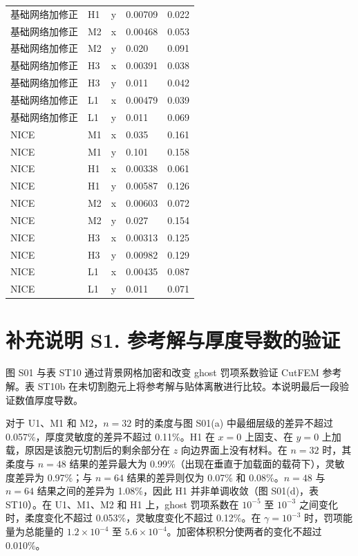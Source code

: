 \documentclass[preprint,12pt,authoryear]{elsarticle}
\begin{document}
{\begin{longtable}[]{@{}lllll@{}}
基础网络加修正 & H1 & y & 0.00709 & 0.022 \\
基础网络加修正 & M2 & x & 0.00468 & 0.053 \\
基础网络加修正 & M2 & y & 0.020 & 0.091 \\
基础网络加修正 & H3 & x & 0.00391 & 0.038 \\
基础网络加修正 & H3 & y & 0.011 & 0.042 \\
基础网络加修正 & L1 & x & 0.00479 & 0.039 \\
基础网络加修正 & L1 & y & 0.011 & 0.069 \\
NICE & M1 & x & 0.035 & 0.161 \\
NICE & M1 & y & 0.101 & 0.158 \\
NICE & H1 & x & 0.00338 & 0.061 \\
NICE & H1 & y & 0.00587 & 0.126 \\
NICE & M2 & x & 0.00603 & 0.072 \\
NICE & M2 & y & 0.027 & 0.154 \\
NICE & H3 & x & 0.00313 & 0.125 \\
NICE & H3 & y & 0.00982 & 0.129 \\
NICE & L1 & x & 0.00435 & 0.087 \\
NICE & L1 & y & 0.011 & 0.071 \\
\end{longtable}}

\section{补充说明 S1. 参考解与厚度导数的验证}

图 S01 与表 ST10 通过背景网格加密和改变 ghost 罚项系数验证 CutFEM 参考解。表 ST10b 在未切割胞元上将参考解与贴体离散进行比较。本说明最后一段验证数值厚度导数。

对于 U1、M1 和 M2，\(n=32\) 时的柔度与图 S01(a) 中最细层级的差异不超过 0.057\%，厚度灵敏度的差异不超过 0.11\%。H1 在 \(x=0\) 上固支、在 \(y=0\) 上加载，原因是该胞元切割后的剩余部分在 \(z\) 向边界面上没有材料。在 \(n=32\) 时，其柔度与 \(n=48\) 结果的差异最大为 0.99\%（出现在垂直于加载面的载荷下），灵敏度差异为 0.97\%；与 \(n=64\) 结果的差异则仅为 0.07\% 和 0.08\%。\(n=48\) 与 \(n=64\) 结果之间的差异为 1.08\%，因此 H1 并非单调收敛（图 S01(d)，表 ST10）。在 U1、M1、M2 和 H1 上，ghost 罚项系数在 \(10^{-5}\) 至 \(10^{-3}\) 之间变化时，柔度变化不超过 0.053\%，灵敏度变化不超过 0.12\%。在 \(\gamma=10^{-3}\) 时，罚项能量为总能量的 \(1.2\times10^{-4}\) 至 \(5.6\times10^{-4}\)。加密体积积分使两者的变化不超过 0.010\%。
\end{document}
